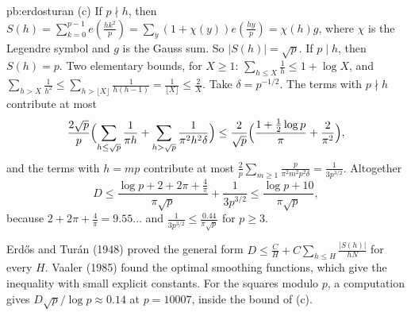 \begin{solution}{pb:erdosturan}
(c) If $p\nmid h$, then $S(h)=\sum_{k=0}^{p-1}e(\frac{hk^2}p)=\sum_y(1+\chi(y))e(\frac{hy}p)=\chi(h)g$, where $\chi$ is the Legendre symbol and $g$ is the Gauss sum. So
$|S(h)|=\sqrt p$. If $p\mid h$, then $S(h)=p$. Two elementary bounds, for $X\ge1$: $\sum_{h\le X}\frac1h\le1+\log X$, and
$\sum_{h>X}\frac1{h^2}\le\sum_{h>\lfloor X\rfloor}\frac1{h(h-1)}=\frac1{\lfloor X\rfloor}\le\frac2X$. Take $\delta=p^{-1/2}$. The terms with $p\nmid h$ contribute at most
\[
\frac{2\sqrt p}p\Bigl(\sum_{h\le\sqrt p}\frac1{\pi h}+\sum_{h>\sqrt p}\frac1{\pi^2h^2\delta}\Bigr)\le\frac2{\sqrt p}\Bigl(\frac{1+\frac12\log p}\pi+\frac2{\pi^2}\Bigr),
\]
and the terms with $h=mp$ contribute at most $\frac2p\sum_{m\ge1}\frac p{\pi^2m^2p^2\delta}=\frac1{3p^{3/2}}$. Altogether
\[
D\le\frac{\log p+2+2\pi+\frac4\pi}{\pi\sqrt p}+\frac1{3p^{3/2}}\le\frac{\log p+10}{\pi\sqrt p},
\]
because $2+2\pi+\frac4\pi=9.55\ldots$ and $\frac1{3p^{3/2}}\le\frac{0.44}{\pi\sqrt p}$ for $p\ge3$.

\leads Erdős and Turán (1948) proved the general form $D\le\frac C H+C\sum_{h\le H}\frac{|S(h)|}{hN}$ for every $H$. Vaaler (1985) found the optimal
smoothing functions, which give the inequality with small explicit constants. For the squares modulo $p$, a computation gives $D\sqrt p/\log p\approx0.14$
at $p=10007$, inside the bound of (c).
\end{solution}

